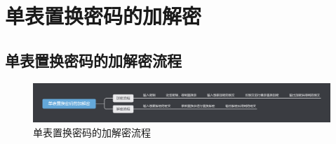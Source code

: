 \section{单表置换密码的加解密}

\subsection{单表置换密码的加解密流程}
\begin{figure}[thbp!]
	\centering
	\includegraphics[width=16cm]{figure/figure2.png}
	\caption{单表置换密码的加解密流程}
	\label{fig:单表置换密码的加解密流程}
\end{figure}

